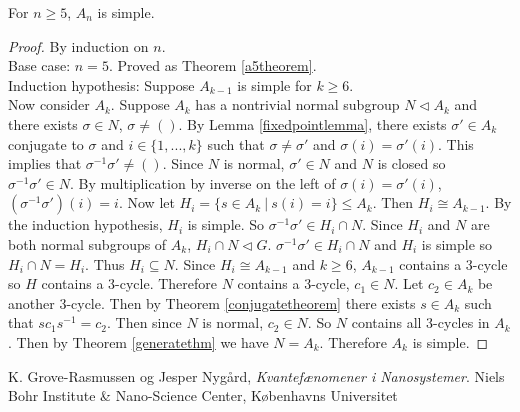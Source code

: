 \documentclass[a4paper]{article}
\begin{document}
\begin{theorem}
For $n \ge 5$, $A_n$ is simple.
\end{theorem}
\begin{proof}
By induction on $n$. \\
Base case: $n = 5$. Proved as Theorem \ref{a5theorem}. \\
Induction hypothesis: Suppose $A_{k-1}$ is simple for $k \ge 6$. \\
Now consider $A_k$. Suppose $A_k$ has a nontrivial normal subgroup $N \triangleleft A_k$ and there exists $\sigma \in N$, $\sigma \ne ()$. By Lemma \ref{fixedpointlemma}, there exists $\sigma' \in A_k$ conjugate to $\sigma$ and $i \in \{1, ..., k\}$ such that $\sigma \ne \sigma'$ and $\sigma(i) = \sigma'(i)$. This implies that $\sigma^{-1} \sigma' \ne ()$. Since $N$ is normal, $\sigma' \in N$ and $N$ is closed so $\sigma^{-1} \sigma' \in N$. By multiplication by inverse on the left of $\sigma(i) = \sigma'(i)$, $(\sigma^{-1} \sigma')(i) = i$. Now let $H_i = \{s \in A_k\ |\ s(i) = i\} \le A_k$. Then $H_i \cong A_{k-1}$. By the induction hypothesis, $H_i$ is simple. So $\sigma^{-1} \sigma' \in H_i \cap N$. Since $H_i$ and $N$ are both normal subgroups of $A_k$, $H_i \cap N \triangleleft G$. $\sigma^{-1} \sigma' \in H_i \cap N$ and $H_i$ is simple so $H_i \cap N = H_i$. Thus $H_i \subseteq N$. Since $H_i \cong A_{k-1}$ and $k \ge 6$, $A_{k-1}$ contains a 3-cycle so $H$ contains a 3-cycle. Therefore $N$ contains a 3-cycle, $c_1 \in N$. Let $c_2 \in A_k$ be another 3-cycle. Then by Theorem \ref{conjugatetheorem} there exists $s \in A_k$ such that $s c_1 s^{-1} = c_2$. Then since $N$ is normal, $c_2 \in N$. So $N$ contains all 3-cycles in $A_k$. Then by Theorem \ref{generatethm} we have $N=A_k$. Therefore $A_k$ is simple.
\end{proof}

\begin{thebibliography}{9}
  K. Grove-Rasmussen og Jesper Nygård,
  \emph{Kvantefænomener i Nanosystemer}.
  Niels Bohr Institute \& Nano-Science Center, Københavns Universitet

\end{thebibliography}
\end{document}
